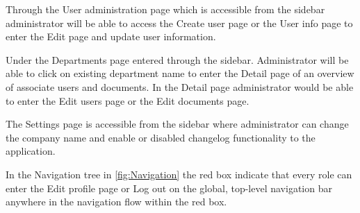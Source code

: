 Through the User administration page which is accessible from the sidebar administrator will be able to access the Create user page or the User info page to enter the Edit page and update user information.

Under the Departments page entered through the sidebar.
Administrator will be able to click on existing department name to enter the Detail page of an overview of associate users and documents.
In the Detail page administrator would be able to enter the Edit users page or the Edit documents page.

The Settings page is accessible from the sidebar where administrator can change the company name and enable or disabled changelog functionality to the application.

In the Navigation tree in \cref{fig:Navigation} the red box indicate that every role can enter the Edit profile page or Log out on the global, top-level navigation bar anywhere in the navigation flow within the red box.
